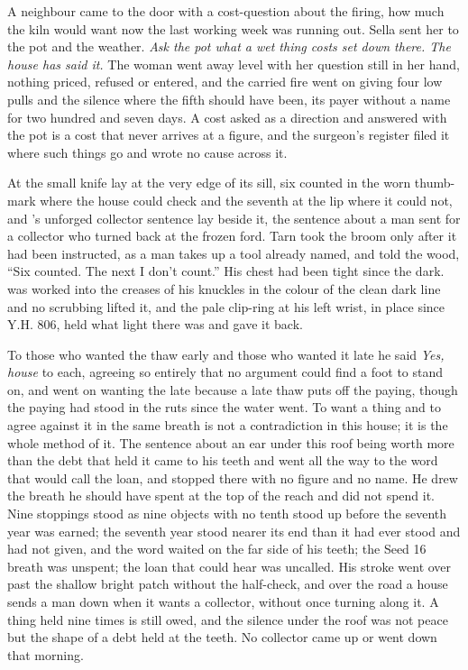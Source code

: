 A neighbour came to the door with a cost-question about the firing, how much the kiln would want now the last working week was running out. Sella sent her to the pot and the weather. \emph{Ask the pot what a wet thing costs set down there. The house has said it.} The woman went away level with her question still in her hand, nothing priced, refused or entered, and the carried fire went on giving four low pulls and the silence where the fifth should have been, its payer without a name for two hundred and seven days. A cost asked as a direction and answered with the pot is a cost that never arrives at a figure, and the surgeon's register filed it where such things go and wrote no cause across it.

\scenebreak

At  the small knife lay at the very edge of its sill, six counted in the worn thumb-mark where the house could check and the seventh at the lip where it could not, and 's unforged collector sentence lay beside it, the sentence about a man sent for a collector who turned back at the frozen ford. Tarn took the broom only after it had been instructed, as a man takes up a tool already named, and told the wood, “Six counted. The next I don't count.” His chest had been tight since the dark.  was worked into the creases of his knuckles in the colour of the clean dark line and no scrubbing lifted it, and the pale clip-ring at his left wrist, in place since Y.H. 806, held what light there was and gave it back.

To those who wanted the thaw early and those who wanted it late he said \emph{Yes, house} to each, agreeing so entirely that no argument could find a foot to stand on, and went on wanting the late because a late thaw puts off the paying, though the paying had stood in the ruts since the water went. To want a thing and to agree against it in the same breath is not a contradiction in this house; it is the whole method of it. The sentence about an ear under this roof being worth more than the debt that held it came to his teeth and went all the way to the word that would call the loan, and stopped there with no figure and no name. He drew the breath he should have spent at the top of the reach and did not spend it. Nine stoppings stood as nine objects with no tenth stood up before the seventh year was earned; the seventh year stood nearer its end than it had ever stood and had not given, and the word waited on the far side of his teeth; the Seed 16 breath was unspent; the loan that could hear was uncalled. His stroke went over  past the shallow bright patch without the half-check, and over the road a house sends a man down when it wants a collector, without once turning along it. A thing held nine times is still owed, and the silence under the roof was not peace but the shape of a debt held at the teeth. No collector came up or went down  that morning.

